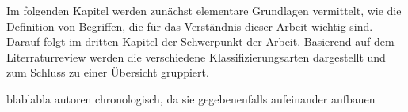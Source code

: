 Im folgenden Kapitel werden zunächst elementare Grundlagen vermittelt, wie die Definition von Begriffen, die für das Verständnis dieser Arbeit wichtig sind.
Darauf folgt im dritten Kapitel der Schwerpunkt der Arbeit. Basierend auf dem Literraturreview werden die verschiedene Klassifizierungsarten dargestellt und zum Schluss zu einer 
Übersicht gruppiert.

blablabla autoren chronologisch, da sie gegebenenfalls aufeinander aufbauen